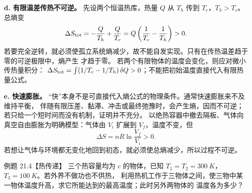 \begin{xesolution}
\textbf{d. 有限温差传热不可逆。} 先设两个恒温热库，热量 $Q$ 从 $T_h$ 传到 $T_c$，$T_h>T_c$。总熵变
\[
  \Delta S_{\rm tot}
  =-\frac{Q}{T_h}+\frac{Q}{T_c}
  =Q\left(\frac1{T_c}-\frac1{T_h}\right)>0.
\]
若要完全逆转，就必须使孤立系统熵减少，故不能自发实现。只有在传热温差趋于零的可逆极限中，熵产生
才趋于零。
若两个有限物体的温度会变化，则应对微小传热量积分：
$\Delta S_{\rm tot}=\int(1/T_c-1/T_h)\,\delta Q>0$；不能把初始温度直接代入有限热量公式。

\textbf{e. 快速膨胀。} “快”本身不是可直接代入熵公式的物理条件。通常快速膨胀来不及维持平衡，
伴随有限压差、黏滞、冲击或最终弛豫时，会产生熵，因而不可逆；若只给一个短时间而没有机制，证明并不充分。
以绝热容器中撤去隔板、气体向真空自由膨胀为明确模型：气体由 $V_i$ 扩展到 $V_f$，温度不变，但
\[
  \Delta S=nR\ln\frac{V_f}{V_i}>0.
\]
若想让气体与环境都无变化地回到初态，就必须使总熵减少，所以过程不可逆。

\end{xesolution}

\begin{origexamplebox}{例题 21.4【热传递】}
三个热容量均为 $c$ 的物体，已知 $T_1=T_2=\SI{300}{K}$，$T_3=\SI{100}{K}$。若外界不做功也不供热，
利用热机工作于三物体之间，使三物中某一物体温度升高，求它所能达到的最高温度；此时另外两物体的
温度各为多少？
\end{origexamplebox}

